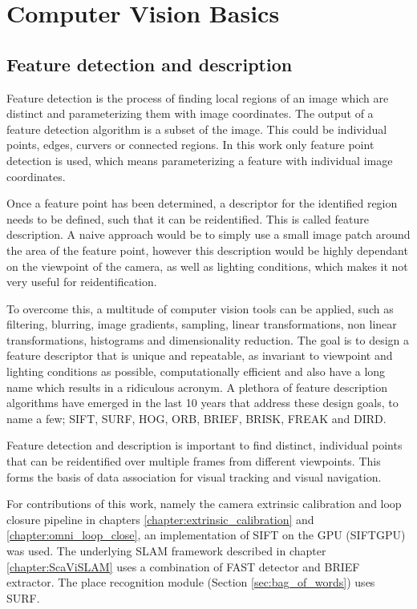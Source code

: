 \section{Computer Vision Basics}
\label{sec:computer_vision}

\subsection{Feature detection and description}
\label{subsec:features}

Feature detection is the process of finding local regions of an image which are distinct and parameterizing them with image coordinates.  The output of a feature detection algorithm is a subset of the image. This could be individual points, edges, curvers or connected regions. In this work only feature point detection is used, which means parameterizing a feature with individual image coordinates.

Once a feature point has been determined, a descriptor for the identified region needs to be defined, such that it can be reidentified.  This is called feature description.  A naive approach would be to simply use a small image patch around the area of the feature point, however this description would be highly dependant on the viewpoint of the camera, as well as lighting conditions, which makes it not very useful for reidentification.

To overcome this, a multitude of computer vision tools can be applied, such as filtering, blurring, image gradients, sampling, linear transformations, non linear transformations, histograms and dimensionality reduction.  The goal is to design a feature descriptor that is unique and repeatable, as invariant to viewpoint and lighting conditions as possible, computationally efficient and also have a long name which results in a ridiculous acronym.  A plethora of feature description algorithms have emerged in the last 10 years that address these design goals, to name a few; SIFT\cite{sift_04}, SURF\cite{surf_06}, HOG\cite{hog_05}, ORB\cite{orb_11}, BRIEF\cite{brief_10}, BRISK\cite{brisk_11}, FREAK\cite{freak_12} and DIRD\cite{lategahn_13}.

Feature detection and description is important to find distinct, individual points that can be reidentified over multiple frames from different viewpoints.  This forms the basis of data association for visual tracking and visual navigation.

For contributions of this work, namely the camera extrinsic calibration and loop closure pipeline in chapters \ref{chapter:extrinsic_calibration} and \ref{chapter:omni_loop_close}, an implementation of SIFT on the GPU\cite{siftgpu_11} (SIFTGPU) was used.  The underlying SLAM framework described in chapter \ref{chapter:ScaViSLAM} uses a combination of FAST detector and BRIEF extractor.  The place recognition module (Section \ref{sec:bag_of_words}) uses SURF.

